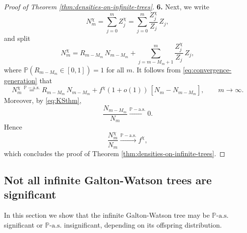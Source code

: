 \documentclass[11pt]{article}
\numberwithin{equation}{section}
\theoremstyle{plain}
\newcommand{\PP}{\mathbb{P}}
\begin{document}
\begin{proof}[Proof of Theorem \ref{thm:densities-on-infinite-trees}]
\medskip\noindent
{\bf 6.}
Next, we write
\[
N_m^\chi = \sum_{j=0}^m Z_j^{\chi}
= \sum_{j=0}^m \frac{Z_j^{\chi}}{Z_j}\,Z_j,
\]
and split
\[
N_m^\chi 
= R_{m-M_m}\,N_{m-M_m} + \sum_{j=m-M_m+1}^m\frac{Z_j^{\chi}}{Z_j}\,Z_j,
\]
where $\PP(R_{m-M_m} \in [0,1]) = 1$ for all $m$. It follows from \eqref{eq:convergence-generation} that
\[
N_m^\chi \stackrel{\PP-\mathrm{a.s.}}{=} R_{m-M_m}\,N_{m-M_m} + f^\chi(1+o(1))\,[N_m - N_{m-M_m}], \qquad m \to \infty.
\]
Moreover, by \eqref{eq:KSthm},
\[
\frac{N_{m-M_m}}{N_m} \stackrel{\PP-\mathrm{a.s.}}{\longrightarrow} 0.
\]
Hence
\[
\frac{N_m^\chi}{N_m} \stackrel{\PP-\mathrm{a.s.}}{\longrightarrow} f^\chi,
\]
which concludes the proof of Theorem \ref{thm:densities-on-infinite-trees}.
\end{proof}



\subsection{Not all infinite Galton-Watson trees are significant}
\label{ss:Ex}

In this section we show that the infinite Galton-Watson tree may be $\PP\text{-}\mathrm{a.s.}$ significant or $\PP\text{-}\mathrm{a.s.}$ insignificant, depending on its offspring distribution.
\end{document}
